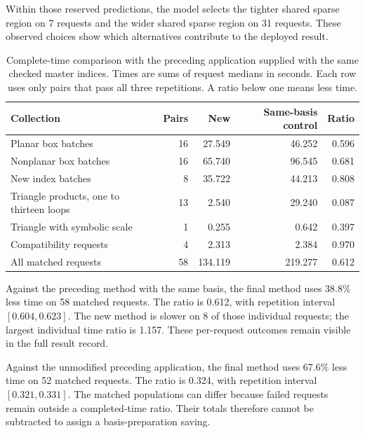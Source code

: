 Within those reserved predictions, the model selects the tighter shared sparse region on 7 requests and the wider shared sparse region on 31 requests. These observed choices show which alternatives contribute to the deployed result.

\begin{table}[!htbp]\centering\small
\caption{Complete-time comparison with the preceding application supplied with the same checked master indices. Times are sums of request medians in seconds. Each row uses only pairs that pass all three repetitions. A ratio below one means less time.}
\label{tab:analytic-batch-times}
\begin{tabularx}{\linewidth}{@{}Yrrrr@{}}\toprule
Collection & Pairs & New & Same-basis control & Ratio\\\midrule
Planar box batches & 16 & 27.549 & 46.252 & 0.596 \\
Nonplanar box batches & 16 & 65.740 & 96.545 & 0.681 \\
New index batches & 8 & 35.722 & 44.213 & 0.808 \\
Triangle products, one to thirteen loops & 13 & 2.540 & 29.240 & 0.087 \\
Triangle with symbolic scale & 1 & 0.255 & 0.642 & 0.397 \\
Compatibility requests & 4 & 2.313 & 2.384 & 0.970 \\
All matched requests & 58 & 134.119 & 219.277 & 0.612 \\
\bottomrule\end{tabularx}\end{table}

Against the preceding method with the same basis, the final method uses 38.8\% less time on 58 matched requests. The ratio is 0.612, with repetition interval $[0.604,0.623]$. The new method is slower on 8 of those individual requests; the largest individual time ratio is 1.157. These per-request outcomes remain visible in the full result record.

Against the unmodified preceding application, the final method uses 67.6\% less time on 52 matched requests. The ratio is 0.324, with repetition interval $[0.321,0.331]$. The matched populations can differ because failed requests remain outside a completed-time ratio. Their totals therefore cannot be subtracted to assign a basis-preparation saving.

